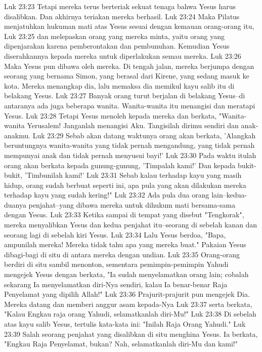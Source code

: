 Luk 23:23  Tetapi mereka terus berteriak sekuat tenaga bahwa Yesus harus disalibkan. Dan akhirnya teriakan mereka berhasil.
Luk 23:24  Maka Pilatus menjatuhkan hukuman mati atas Yesus sesuai dengan kemauan orang-orang itu,
Luk 23:25  dan melepaskan orang yang mereka minta, yaitu orang yang dipenjarakan karena pemberontakan dan pembunuhan. Kemudian Yesus diserahkannya kepada mereka untuk diperlakukan semau mereka.
Luk 23:26  Maka Yesus pun dibawa oleh mereka. Di tengah jalan, mereka berjumpa dengan seorang yang bernama Simon, yang berasal dari Kirene, yang sedang masuk ke kota. Mereka menangkap dia, lalu memaksa dia memikul kayu salib itu di belakang Yesus.
Luk 23:27  Banyak orang turut berjalan di belakang Yesus--di antaranya ada juga beberapa wanita. Wanita-wanita itu menangisi dan meratapi Yesus.
Luk 23:28  Tetapi Yesus menoleh kepada mereka dan berkata, "Wanita-wanita Yerusalem! Janganlah menangisi Aku. Tangisilah dirimu sendiri dan anak-anakmu.
Luk 23:29  Sebab akan datang waktunya orang akan berkata, 'Alangkah beruntungnya wanita-wanita yang tidak pernah mengandung, yang tidak pernah mempunyai anak dan tidak pernah menyusui bayi!'
Luk 23:30  Pada waktu itulah orang akan berkata kepada gunung-gunung, 'Timpalah kami!' Dan kepada bukit-bukit, 'Timbunilah kami!'
Luk 23:31  Sebab kalau terhadap kayu yang masih hidup, orang sudah berbuat seperti ini, apa pula yang akan dilakukan mereka terhadap kayu yang sudah kering!"
Luk 23:32  Ada pula dua orang lain--kedua-duanya penjahat--yang dibawa mereka untuk dihukum mati bersama-sama dengan Yesus.
Luk 23:33  Ketika sampai di tempat yang disebut "Tengkorak", mereka menyalibkan Yesus dan kedua penjahat itu--seorang di sebelah kanan dan seorang lagi di sebelah kiri Yesus.
Luk 23:34  Lalu Yesus berdoa, "Bapa, ampunilah mereka! Mereka tidak tahu apa yang mereka buat." Pakaian Yesus dibagi-bagi di situ di antara mereka dengan undian.
Luk 23:35  Orang-orang berdiri di situ sambil menonton, sementara pemimpin-pemimpin Yahudi mengejek Yesus dengan berkata, "Ia sudah menyelamatkan orang lain; cobalah sekarang Ia menyelamatkan diri-Nya sendiri, kalau Ia benar-benar Raja Penyelamat yang dipilih Allah!"
Luk 23:36  Prajurit-prajurit pun mengejek Dia. Mereka datang dan memberi anggur asam kepada-Nya
Luk 23:37  serta berkata, "Kalau Engkau raja orang Yahudi, selamatkanlah diri-Mu!"
Luk 23:38  Di sebelah atas kayu salib Yesus, tertulis kata-kata ini: "Inilah Raja Orang Yahudi."
Luk 23:39  Salah seorang penjahat yang disalibkan di situ menghina Yesus. Ia berkata, "Engkau Raja Penyelamat, bukan? Nah, selamatkanlah diri-Mu dan kami!"
